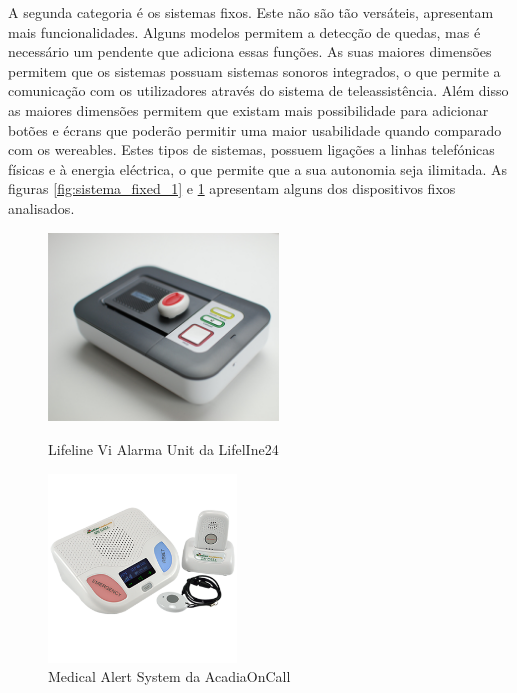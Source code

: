 A segunda categoria é os sistemas fixos. Este não são tão versáteis, apresentam mais funcionalidades. Alguns modelos permitem a detecção de quedas, mas é necessário um pendente que adiciona essas funções. As suas maiores dimensões permitem que os sistemas possuam sistemas sonoros integrados, o que permite a comunicação com os utilizadores através do sistema de teleassistência. Além disso as maiores dimensões permitem que existam mais possibilidade para adicionar botões e écrans que poderão permitir uma maior usabilidade quando comparado com os wereables. Estes tipos de sistemas, possuem ligações a linhas telefónicas físicas e à energia eléctrica, o que permite que a sua autonomia seja ilimitada.
As figuras \ref{fig:sistema_fixed_1} e \ref{fig:sistema_fixed_2} apresentam alguns dos dispositivos fixos analisados.
\vspace*{-11cm}
\begin{figure}[!htb]
	\centering
	\begin{minipage}[b]{0.45\textwidth}\centering
		\includegraphics[height=5cm]{figuras/Sistemas_Lifeline.png}
		\caption{Lifeline Vi Alarma Unit da LifelIne24}
		\label{fig:sistema_fixed_1}
	\end{minipage}
	\hfill
	\begin{minipage}[b]{0.45\textwidth}\centering
		\includegraphics[height=5cm]{figuras/sistemas_Medical_Alert_System.png}
		\caption{Medical Alert System da AcadiaOnCall}
		\label{fig:sistema_fixed_2}
	\end{minipage}
\end{figure}

\pagebreak